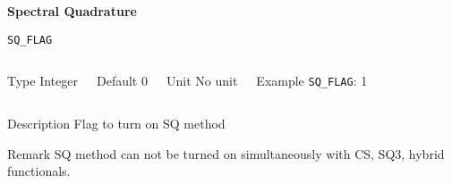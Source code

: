 
\begin{frame}[allowframebreaks,c]{} \label{SQ}

\begin{center}
\Huge \textbf{Spectral Quadrature}
\end{center}

\end{frame}

\begin{frame}[allowframebreaks]{\texttt{SQ\_FLAG}} \label{SQ_FLAG}
\vspace*{-12pt}
\begin{columns}
\begin{block}{Type}
Integer
\end{block}

\begin{block}{Default}
0
\end{block}

\begin{block}{Unit}
No unit
\end{block}

\begin{block}{Example}
\texttt{SQ\_FLAG}: 1
\end{block}
\end{columns}

\begin{block}{Description}
Flag to turn on SQ method 
\end{block}

\begin{block}{Remark}
SQ method can not be turned on simultaneously with CS, SQ3, hybrid functionals. 
\end{block}

\end{frame}

